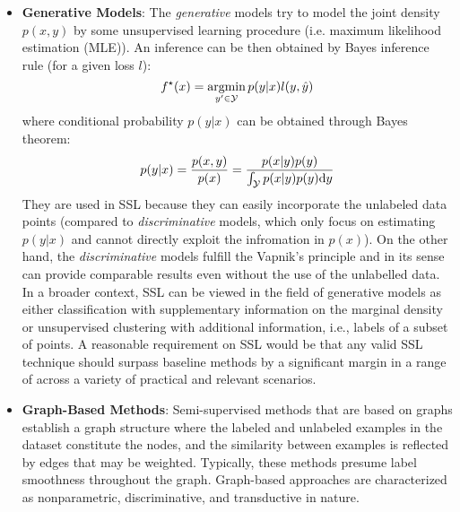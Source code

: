 \begin{itemize}
    \item \textbf{Generative Models}: The \textit{generative} models try to model the joint density $p(x,y)$ by some unsupervised learning procedure (i.e. maximum
        likelihood estimation (MLE)). An inference can be then obtained by Bayes inference rule (for a given loss $l$):
        \begin{equation*}
            f^{\star}(x) = \mathop{\rm argmin}_{y^\prime\in \mathcal{Y}} p(y|x)l(y,\hat{y})
        \end{equation*}
        where conditional probability $p(y|x)$ can be obtained through Bayes theorem:
        \begin{equation*}
            p(y|x) = \frac{p(x,y)}{p(x)} =\frac{p(x|y)p(y)}{\int_\mathcal{Y} p(x|y)p(y) \mbox{\rm d}y}
        \end{equation*}
        They are used in SSL because they can easily incorporate the unlabeled data points (compared to \textit{discriminative} models, which only focus on estimating
        $p(y|x)$ and cannot directly exploit the infromation in $p(x)$). On the other hand, the \textit{discriminative} models fulfill the Vapnik's principle and in its
        sense can provide comparable results even without the use of the unlabelled data.  In a broader context, SSL can be viewed in the field of generative models as 
        either classification with supplementary information on the marginal density or unsupervised clustering with additional information, i.e., labels of a subset 
        of points. A reasonable requirement on SSL would be that any valid SSL technique should surpass baseline methods by a significant margin in a range of across a
        variety of practical and relevant scenarios.

        
    \item \textbf{Graph-Based Methods}:
    Semi-supervised methods that are based on graphs establish a graph structure where the labeled and unlabeled examples in the dataset constitute the nodes, and the 
    similarity between examples is reflected by edges that may be weighted. Typically, these methods presume label smoothness throughout the graph. Graph-based 
    approaches are characterized as nonparametric, discriminative, and transductive in nature\cite{another-survey-2008}.
\end{itemize}


